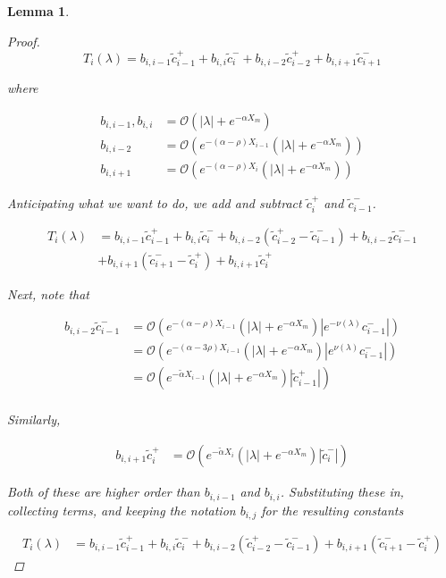 \documentclass[12pt]{article}
\newtheorem{lemma}{Lemma}
\begin{document}
\begin{lemma}
\begin{proof}
\[
T_i(\lambda) = b_{i,i-1} \tilde{c}_{i-1}^+ + b_{i,i} \tilde{c}_{i}^- + b_{i,i-2} \tilde{c}_{i-2}^+ + b_{i,i+1} \tilde{c}_{i+1}^-
\] 

where

\begin{align*}
b_{i,i-1}, b_{i,i} &= \mathcal{O}(|\lambda| + e^{-\alpha X_m}) \\
b_{i,i-2} &= \mathcal{O}(e^{-(\alpha - \rho) X_{i-1}}(|\lambda| + e^{-\alpha X_m})) \\
b_{i,i+1} &= \mathcal{O}(e^{-(\alpha - \rho) X_i}(|\lambda| + e^{-\alpha X_m}))
\end{align*}

Anticipating what we want to do, we add and subtract $\tilde{c}_i^+$ and $\tilde{c}_{i-1}^-$.

\begin{align*}
T_i(\lambda) &= b_{i,i-1} \tilde{c}_{i-1}^+ + b_{i,i} \tilde{c}_{i}^- + b_{i,i-2} ( \tilde{c}_{i-2}^+ - \tilde{c}_{i-1}^-) + b_{i,i-2} \tilde{c}_{i-1}^- \\
& + b_{i,i+1} (\tilde{c}_{i+1}^- - \tilde{c}_i^+) + b_{i,i+1} \tilde{c}_i^+
\end{align*}

Next, note that

\begin{align*}
b_{i,i-2} \tilde{c}_{i-1}^- &= \mathcal{O}(e^{-(\alpha - \rho) X_{i-1}}(|\lambda| + e^{-\alpha X_m})|e^{-\nu(\lambda)}c_{i-1}^-|) \\
&= \mathcal{O}(e^{-(\alpha - 3 \rho) X_{i-1}}(|\lambda| + e^{-\alpha X_m})|e^{\nu(\lambda)}c_{i-1}^-|) \\
&= \mathcal{O}(e^{-\tilde{\alpha} X_{i-1}}(|\lambda| + e^{-\alpha X_m})|\tilde{c}_{i-1}^+|) \\
\end{align*}

Similarly,

\begin{align*}
b_{i,i+1} \tilde{c}_i^+ &= \mathcal{O}(e^{-\tilde{\alpha} X_i}(|\lambda| + e^{-\alpha X_m})|\tilde{c}_i^-|)
\end{align*}

Both of these are higher order than $b_{i,i-1}$ and $b_{i,i}$. Substituting these in, collecting terms, and keeping the notation $b_{i,j}$ for the resulting constants

\begin{align*}
T_i(\lambda) &= b_{i,i-1} \tilde{c}_{i-1}^+ + b_{i,i} \tilde{c}_{i}^- + b_{i,i-2} ( \tilde{c}_{i-2}^+ - \tilde{c}_{i-1}^-) + b_{i,i+1} (\tilde{c}_{i+1}^- - \tilde{c}_i^+)
\end{align*}


\end{proof}
\end{lemma}
\end{document}
